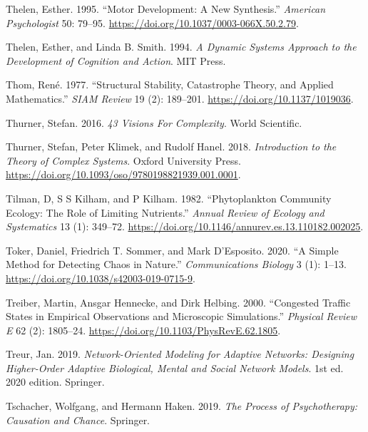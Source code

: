\documentclass[
  a4paper,
  DIV=11,
  numbers=noendperiod,
  oneside]{scrreprt}
\newlength{\cslhangindent}
\newenvironment{CSLReferences}[2] %
 {\begin{list}{}{%
  \setlength{\itemindent}{0pt}
  \setlength{\leftmargin}{0pt}
  \setlength{\parsep}{0pt}
  \ifodd #1
   \setlength{\leftmargin}{\cslhangindent}
   \setlength{\itemindent}{-1\cslhangindent}
  \fi
  \setlength{\itemsep}{#2\baselineskip}}}
 {\end{list}}
\begin{document}
\begin{CSLReferences}{1}{0}
Thelen, Esther. 1995. {``Motor Development: {A} New Synthesis.''}
\emph{American Psychologist} 50: 79--95.
\url{https://doi.org/10.1037/0003-066X.50.2.79}.

Thelen, Esther, and Linda B. Smith. 1994. \emph{A {Dynamic Systems
Approach} to the {Development} of {Cognition} and {Action}}. {MIT
Press}.

Thom, René. 1977. {``Structural {Stability}, {Catastrophe Theory}, and
{Applied Mathematics}.''} \emph{SIAM Review} 19 (2): 189--201.
\url{https://doi.org/10.1137/1019036}.

Thurner, Stefan. 2016. \emph{43 Visions For Complexity}. World
Scientific.

Thurner, Stefan, Peter Klimek, and Rudolf Hanel. 2018.
\emph{Introduction to the {Theory} of {Complex Systems}}. Oxford
University Press.
\url{https://doi.org/10.1093/oso/9780198821939.001.0001}.

Tilman, D, S S Kilham, and P Kilham. 1982. {``Phytoplankton {Community
Ecology}: {The Role} of {Limiting Nutrients}.''} \emph{Annual Review of
Ecology and Systematics} 13 (1): 349--72.
\url{https://doi.org/10.1146/annurev.es.13.110182.002025}.

Toker, Daniel, Friedrich T. Sommer, and Mark D'Esposito. 2020. {``A
Simple Method for Detecting Chaos in Nature.''} \emph{Communications
Biology} 3 (1): 1--13. \url{https://doi.org/10.1038/s42003-019-0715-9}.

Treiber, Martin, Ansgar Hennecke, and Dirk Helbing. 2000. {``Congested
Traffic States in Empirical Observations and Microscopic Simulations.''}
\emph{Physical Review E} 62 (2): 1805--24.
\url{https://doi.org/10.1103/PhysRevE.62.1805}.

Treur, Jan. 2019. \emph{Network-Oriented Modeling for Adaptive Networks:
Designing Higher-Order Adaptive Biological, Mental and Social Network
Models}. 1st ed. 2020 edition. Springer.

Tschacher, Wolfgang, and Hermann Haken. 2019. \emph{The Process of
Psychotherapy: Causation and Chance}. Springer.


\end{CSLReferences}
\end{document}
